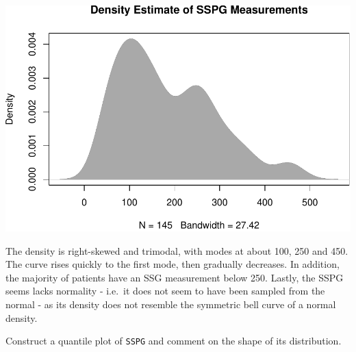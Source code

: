 \documentclass[9pt,letter]{article}
\newenvironment{Shaded}{\begin{snugshade}}{\end{snugshade}}
\newcommand{\KeywordTok}[1]{\textcolor[rgb]{0.13,0.29,0.53}{\textbf{#1}}}
\newcommand{\DataTypeTok}[1]{\textcolor[rgb]{0.13,0.29,0.53}{#1}}
\newcommand{\StringTok}[1]{\textcolor[rgb]{0.31,0.60,0.02}{#1}}
\newcommand{\OperatorTok}[1]{\textcolor[rgb]{0.81,0.36,0.00}{\textbf{#1}}}
\newcommand{\NormalTok}[1]{#1}
\begin{document}
\begin{Shaded}
\end{Shaded}

\includegraphics{a4_testing_files/figure-latex/unnamed-chunk-3-1.pdf}

The density is right-skewed and trimodal, with modes at about 100, 250
and 450. The curve rises quickly to the first mode, then gradually
decreases. In addition, the majority of patients have an SSG measurement
below 250. Lastly, the SSPG seems lacks normality - i.e.~it does not
seem to have been sampled from the normal - as its density does not
resemble the symmetric bell curve of a normal density.

\item 

Construct a quantile plot of \texttt{SSPG} and comment on the shape of
its distribution.
\end{document}
